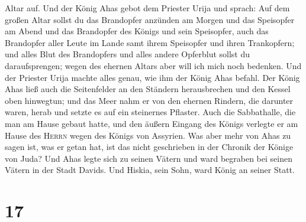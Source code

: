 Altar auf.  Und der König Ahas gebot dem Priester Urija
und sprach: Auf dem großen Altar sollst du das Brandopfer anzünden am
Morgen und das Speisopfer am Abend und das Brandopfer des Königs und
sein Speisopfer, auch das Brandopfer aller Leute im Lande samt ihrem
Speisopfer und ihren Trankopfern; und alles Blut des Brandopfers und
alles andere Opferblut sollst du daraufsprengen; wegen des ehernen
Altars aber will ich mich noch bedenken.  Und der
Priester Urija machte alles genau, wie ihm der König Ahas befahl.
 Der König Ahas ließ auch die Seitenfelder an den
Ständern herausbrechen und den Kessel oben hinwegtun; und das Meer nahm
er von den ehernen Rindern, die darunter waren, herab und setzte es auf
ein steinernes Pflaster.  Auch die Sabbathalle, die man
am Hause gebaut hatte, und den äußern Eingang des Königs verlegte er am
Hause des \textsc{Herrn} wegen des Königs von Assyrien. 
Was aber mehr von Ahas zu sagen ist, was er getan hat, ist das nicht
geschrieben in der Chronik der Könige von Juda?  Und Ahas
legte sich zu seinen Vätern und ward begraben bei seinen Vätern in der
Stadt Davids. Und Hiskia, sein Sohn, ward König an seiner Statt.

\hypertarget{section-16}{%
\section{17}\label{section-16}}

